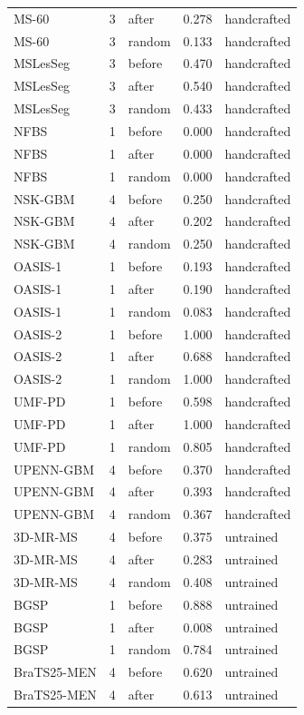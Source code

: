 \begin{tabular}{lrlrl}
MS-60 & 3 & after & 0.278 & handcrafted \\
MS-60 & 3 & random & 0.133 & handcrafted \\
MSLesSeg & 3 & before & 0.470 & handcrafted \\
MSLesSeg & 3 & after & 0.540 & handcrafted \\
MSLesSeg & 3 & random & 0.433 & handcrafted \\
NFBS & 1 & before & 0.000 & handcrafted \\
NFBS & 1 & after & 0.000 & handcrafted \\
NFBS & 1 & random & 0.000 & handcrafted \\
NSK-GBM & 4 & before & 0.250 & handcrafted \\
NSK-GBM & 4 & after & 0.202 & handcrafted \\
NSK-GBM & 4 & random & 0.250 & handcrafted \\
OASIS-1 & 1 & before & 0.193 & handcrafted \\
OASIS-1 & 1 & after & 0.190 & handcrafted \\
OASIS-1 & 1 & random & 0.083 & handcrafted \\
OASIS-2 & 1 & before & 1.000 & handcrafted \\
OASIS-2 & 1 & after & 0.688 & handcrafted \\
OASIS-2 & 1 & random & 1.000 & handcrafted \\
UMF-PD & 1 & before & 0.598 & handcrafted \\
UMF-PD & 1 & after & 1.000 & handcrafted \\
UMF-PD & 1 & random & 0.805 & handcrafted \\
UPENN-GBM & 4 & before & 0.370 & handcrafted \\
UPENN-GBM & 4 & after & 0.393 & handcrafted \\
UPENN-GBM & 4 & random & 0.367 & handcrafted \\
3D-MR-MS & 4 & before & 0.375 & untrained \\
3D-MR-MS & 4 & after & 0.283 & untrained \\
3D-MR-MS & 4 & random & 0.408 & untrained \\
BGSP & 1 & before & 0.888 & untrained \\
BGSP & 1 & after & 0.008 & untrained \\
BGSP & 1 & random & 0.784 & untrained \\
BraTS25-MEN & 4 & before & 0.620 & untrained \\
BraTS25-MEN & 4 & after & 0.613 & untrained \\

\end{tabular}

